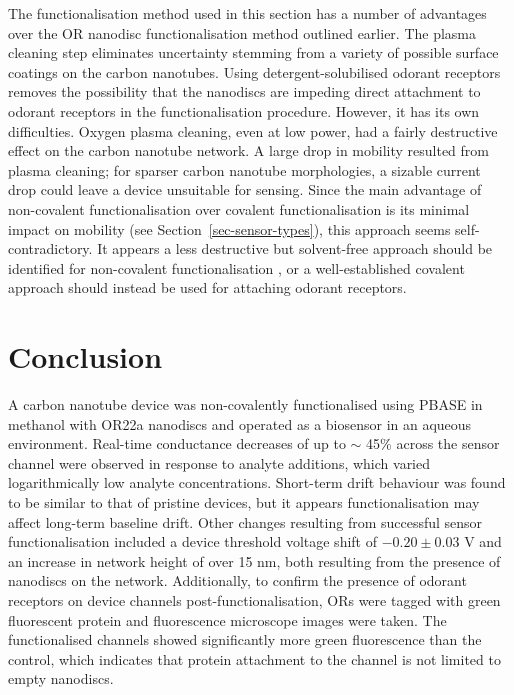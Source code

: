 \documentclass[
  a4paper,
]{scrbook}
\begin{document}
The functionalisation method used in this section has a number of
advantages over the OR nanodisc functionalisation method outlined
earlier. The plasma cleaning step eliminates uncertainty stemming from a
variety of possible surface coatings on the carbon nanotubes. Using
detergent-solubilised odorant receptors removes the possibility that the
nanodiscs are impeding direct attachment to odorant receptors in the
functionalisation procedure. However, it has its own difficulties.
Oxygen plasma cleaning, even at low power, had a fairly destructive
effect on the carbon nanotube network. A large drop in mobility resulted
from plasma cleaning; for sparser carbon nanotube morphologies, a
sizable current drop could leave a device unsuitable for sensing. Since
the main advantage of non-covalent functionalisation over covalent
functionalisation is its minimal impact on mobility (see
Section~\ref{sec-sensor-types}), this approach seems self-contradictory.
It appears a less destructive but solvent-free approach should be
identified for non-covalent functionalisation \autocite{Ashraf2014}, or
a well-established covalent approach should instead be used for
attaching odorant receptors.

\hypertarget{conclusion-1}{%
\section{Conclusion}\label{conclusion-1}}

A carbon nanotube device was non-covalently functionalised using PBASE
in methanol with OR22a nanodiscs and operated as a biosensor in an
aqueous environment. Real-time conductance decreases of up to \(\sim\)
45\% across the sensor channel were observed in response to analyte
additions, which varied logarithmically low analyte concentrations.
Short-term drift behaviour was found to be similar to that of pristine
devices, but it appears functionalisation may affect long-term baseline
drift. Other changes resulting from successful sensor functionalisation
included a device threshold voltage shift of \(-0.20 \pm 0.03\) V and an
increase in network height of over 15 nm, both resulting from the
presence of nanodiscs on the network. Additionally, to confirm the
presence of odorant receptors on device channels post-functionalisation,
ORs were tagged with green fluorescent protein and fluorescence
microscope images were taken. The functionalised channels showed
significantly more green fluorescence than the control, which indicates
that protein attachment to the channel is not limited to empty
nanodiscs.
\end{document}
